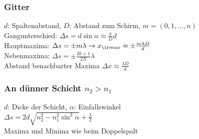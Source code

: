 \begin{sectionbox}
    \subsubsection{Gitter}
    $d$: Spaltenabstand, $D$: Abstand zum Schirm, $m = (0,1,...,n)$ \\
    Gangunterschied: $\Delta s = d\sin\alpha \approx \frac{x}{D}d$ \\
    Hauptmaxima: $\Delta s=\pm m\lambda \rightarrow x_{\ir max}\approx\pm\frac{m\lambda D}{d}$ \\
    Nebenmaxima: $\Delta s = \pm \frac{2k + 1}{2N}\lambda$\\
    Abstand benachbarter Maxima $\Delta x \approx \frac{\lambda D}{d}$ \\

    \subsubsection{An dünner Schicht $n_2 > n_1$}
    $d$: Dicke der Schicht, $\alpha$: Einfallswinkel \\
    $\Delta s = 2d \sqrt{n_2^2-n_1^2\sin^2\alpha} + \frac{\lambda}{2}$ \\
    Maxima und Minima wie beim Doppelspalt
\end{sectionbox}